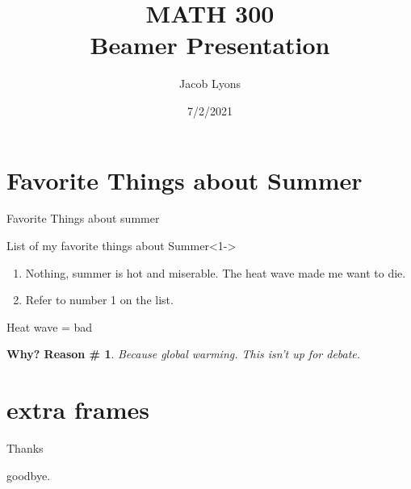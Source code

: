 \documentclass{beamer}
\title[MATH 300 Beamer Presentation]{MATH 300 \\Beamer Presentation}
\author{Jacob Lyons}
\institute{Washington State University}
\date{7/2/2021}
\newtheorem{environment}{Why? Reason \#}
\begin{document}
	
	\begin{frame}
		\titlepage
	\end{frame}
	
	
	\section{Favorite Things about Summer}
	
	\begin{frame}{Favorite Things about summer}
		
		\begin{block}{List of my favorite things about Summer}<1->
			\begin{enumerate}
				\item Nothing, summer is hot and miserable. The heat wave made me want to die.
				\\
				
				\item Refer to number 1 on the list.
			\end{enumerate}
		\end{block}
	\end{frame}

	\begin{frame}{Heat wave = bad}
			
		\begin{environment}
			Because global warming. This isn't up for debate.
		\end{environment}
		 
	\end{frame}
		
	
	\section{extra frames}
	
	\begin{frame}
		Thanks
	\end{frame}
	
	\begin{frame}
		goodbye.
	\end{frame}
	
\end{document}
